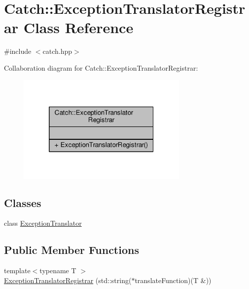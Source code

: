 \hypertarget{class_catch_1_1_exception_translator_registrar}{\section{Catch\-:\-:Exception\-Translator\-Registrar Class Reference}
\label{class_catch_1_1_exception_translator_registrar}
}


{\ttfamily \#include $<$catch.\-hpp$>$}



Collaboration diagram for Catch\-:\-:Exception\-Translator\-Registrar\-:
\nopagebreak
\begin{figure}[H]
\begin{center}
\leavevmode
\includegraphics[width=236pt]{class_catch_1_1_exception_translator_registrar__coll__graph}
\end{center}
\end{figure}
\subsection*{Classes}
\begin{DoxyCompactItemize}
\item 
class \hyperlink{class_catch_1_1_exception_translator_registrar_1_1_exception_translator}{Exception\-Translator}
\end{DoxyCompactItemize}
\subsection*{Public Member Functions}
\begin{DoxyCompactItemize}
\item 
{\footnotesize template$<$typename T $>$ }\\\hyperlink{class_catch_1_1_exception_translator_registrar_aa73229de911f26b1df6c6c87c4d9e04e}{Exception\-Translator\-Registrar} (std\-::string($\ast$translate\-Function)(T \&))
\end{DoxyCompactItemize}


